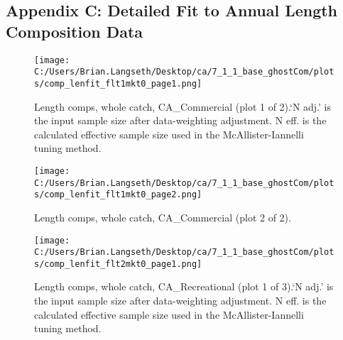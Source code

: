 \documentclass[11pt,
  english,
  a4paper,
]{article}
\begin{document}
\clearpage


\hypertarget{append_c}{%
\subsection{Appendix C: Detailed Fit to Annual Length Composition Data}\label{append_c}}

\leavevmode\tagmcend\tagstructend


\begin{figure}
\centering
\texttt{[image: C:/Users/Brian.Langseth/Desktop/ca/7\_1\_1\_base\_ghostCom/plots/comp\_lenfit\_flt1mkt0\_page1.png]}
\caption{Length comps, whole catch, CA\_Commercial (plot 1 of 2).`N adj.' is the input sample size after data-weighting adjustment. N eff. is the calculated effective sample size used in the McAllister-Iannelli tuning method.\label{fig:comp_lenfit_flt1mkt0_page1}}
\end{figure}

\tagmcend\tagstructend


\begin{figure}
\centering
\texttt{[image: C:/Users/Brian.Langseth/Desktop/ca/7\_1\_1\_base\_ghostCom/plots/comp\_lenfit\_flt1mkt0\_page2.png]}
\caption{Length comps, whole catch, CA\_Commercial (plot 2 of 2).\label{fig:comp_lenfit_flt1mkt0_page2}}
\end{figure}

\tagmcend\tagstructend


\begin{figure}
\centering
\texttt{[image: C:/Users/Brian.Langseth/Desktop/ca/7\_1\_1\_base\_ghostCom/plots/comp\_lenfit\_flt2mkt0\_page1.png]}
\caption{Length comps, whole catch, CA\_Recreational (plot 1 of 3).`N adj.' is the input sample size after data-weighting adjustment. N eff. is the calculated effective sample size used in the McAllister-Iannelli tuning method.\label{fig:comp_lenfit_flt2mkt0_page1}}
\end{figure}
\end{document}
